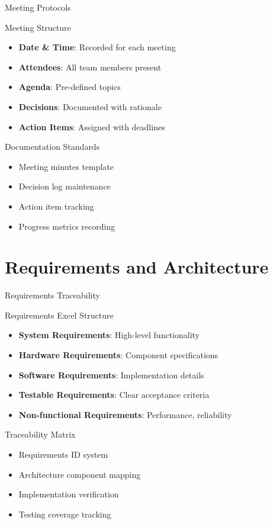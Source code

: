 \documentclass[aspectratio=169]{beamer}
\begin{document}
\begin{frame}{Meeting Protocols}
\begin{block}{Meeting Structure}
\begin{itemize}
    \item \textbf{Date \& Time}: Recorded for each meeting
    \item \textbf{Attendees}: All team members present
    \item \textbf{Agenda}: Pre-defined topics
    \item \textbf{Decisions}: Documented with rationale
    \item \textbf{Action Items}: Assigned with deadlines
\end{itemize}
\end{block}

\begin{block}{Documentation Standards}
\begin{itemize}
    \item Meeting minutes template
    \item Decision log maintenance
    \item Action item tracking
    \item Progress metrics recording
\end{itemize}
\end{block}
\end{frame}

\section{Requirements and Architecture}

\begin{frame}{Requirements Traceability}
\begin{block}{Requirements Excel Structure}
\begin{itemize}
    \item \textbf{System Requirements}: High-level functionality
    \item \textbf{Hardware Requirements}: Component specifications
    \item \textbf{Software Requirements}: Implementation details
    \item \textbf{Testable Requirements}: Clear acceptance criteria
    \item \textbf{Non-functional Requirements}: Performance, reliability
\end{itemize}
\end{block}

\begin{block}{Traceability Matrix}
\begin{itemize}
    \item Requirements ID system
    \item Architecture component mapping
    \item Implementation verification
    \item Testing coverage tracking
\end{itemize}
\end{block}
\end{frame}
\end{document}
